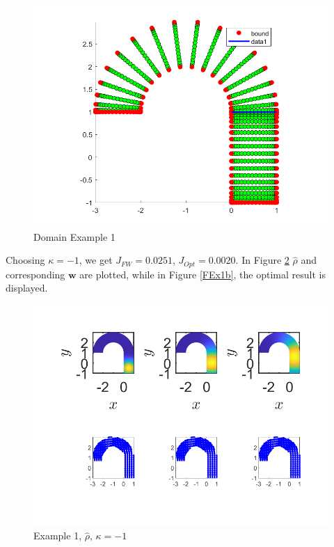 \documentclass[11pt, a4paper]{article}
\theoremstyle{definition}
\newcommand{\w}{\mathbf{w}}
\begin{document}
\begin{figure}[h]
	\centering
	\includegraphics[scale=0.6]{Dom1.png}
	\caption{Domain Example 1} 
	\label{Dom1}
\end{figure}
Choosing $\kappa = -1$, we get $J_{FW} = 0.0251$, $J_{Opt} = 0.0020$. In Figure \ref{FEx1a} $\widehat \rho$ and corresponding $\w$ are plotted, while in Figure \ref{FEx1b}, the optimal result is displayed. 
\begin{figure}[h]
	\centering
	\includegraphics[scale=0.6]{FW1n1.png}
	\caption{Example 1, $\widehat \rho$, $\kappa = -1$} 
	\label{FEx1a}
\end{figure}
\end{document}
